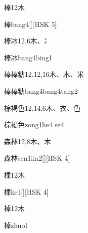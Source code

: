 \begin{entry}{棒}{12}{⽊}
  \begin{phonetics}{棒}{bang4}[][HSK 5]
  \end{phonetics}
\end{entry}

\begin{entry}{棒冰}{12,6}{⽊、⼎}
  \begin{phonetics}{棒冰}{bang4bing1}
  \end{phonetics}
\end{entry}

\begin{entry}{棒棒糖}{12,12,16}{⽊、⽊、⽶}
  \begin{phonetics}{棒棒糖}{bang4bang4tang2}
  \end{phonetics}
\end{entry}

\begin{entry}{棕褐色}{12,14,6}{⽊、⾐、⾊}
  \begin{phonetics}{棕褐色}{zong1he4 se4}
  \end{phonetics}
\end{entry}

\begin{entry}{森林}{12,8}{⽊、⽊}
  \begin{phonetics}{森林}{sen1lin2}[][HSK 4]
  \end{phonetics}
\end{entry}

\begin{entry}{棵}{12}{⽊}
  \begin{phonetics}{棵}{ke1}[][HSK 4]
  \end{phonetics}
\end{entry}

\begin{entry}{棹}{12}{⽊}
  \begin{phonetics}{棹}{zhuo1}
  \end{phonetics}
\end{entry}

